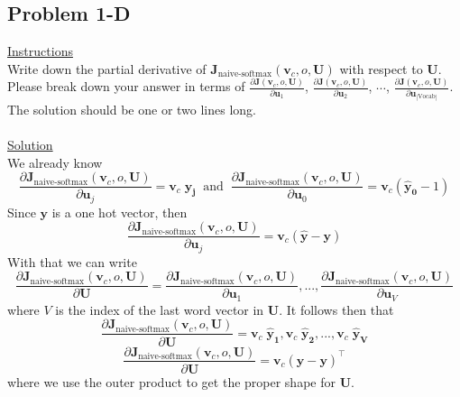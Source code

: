 \documentclass[12pt]{article}
\begin{document}
\subsection{Problem 1-D}
\underline{Instructions}
~\\
Write down the partial derivative of $\bm J_{\text{naive-softmax}}(\bm v_c, o, \bm U)$ 
with respect to $\bm U$. Please break down your answer in terms of 
$\frac{\partial \bm J(\bm v_c, o, \bm U)}{\partial \bm u_1}$, 
$\frac{\partial \bm J(\bm v_c, o, \bm U)}{\partial \bm u_2}$, 
$\cdots$, $\frac{\partial \bm J(\bm v_c, o, \bm U)}{\partial \bm u_{|\text{Vocab}|}}$. 
The solution should be one or two lines long.
~\\
~\\
\underline{Solution}
~\\
We already know 
\begin{equation*}
    \frac{\partial \bm J_{\text{naive-softmax}}(\bm v_c, o, \bm U)}{\partial \bm u_j} = 
    \bm v_c \; \bm {\hat y_j} \; \; \text{and} \; \; 
    \frac{\partial \bm J_{\text{naive-softmax}}(\bm v_c, o, \bm U)}{\partial \bm u_0} = 
    \bm v_c ( \bm {\hat y_0} - 1 )
\end{equation*}
Since $\bm y$ is a one hot vector, then
\begin{equation*}
    \frac{\partial \bm J_{\text{naive-softmax}}(\bm v_c, o, \bm U)}{\partial \bm u_j} = 
    \bm v_c ( \bm {\hat y} - \bm y )
\end{equation*}
With that we can write
\begin{equation*}
    \frac{\partial \bm J_{\text{naive-softmax}}(\bm v_c, o, \bm U)}{\partial \bm U} = 
    \frac{\partial \bm J_{\text{naive-softmax}}(\bm v_c, o, \bm U)}{\partial \bm u_1}, ..., 
    \frac{\partial \bm J_{\text{naive-softmax}}(\bm v_c, o, \bm U)}{\partial \bm u_V}
\end{equation*}
where $V$ is the index of the last word vector in $\bm U$. It follows then that 
\begin{equation*}
    \frac{\partial \bm J_{\text{naive-softmax}}(\bm v_c, o, \bm U)}{\partial \bm U} = 
    \bm v_c \; \bm {\hat y_1}, 
    \bm v_c \; \bm {\hat y_2}
    , ..., 
    \bm v_c \; \bm {\hat y_V}
\end{equation*}
\begin{equation*}
    \frac{\partial \bm J_{\text{naive-softmax}}(\bm v_c, o, \bm U)}{\partial \bm U} = 
    \bm v_c ( \bm {\hat y} - \bm y )^\top
\end{equation*}
where we use the outer product to get the proper shape for $\bm U$. 
\end{document}
